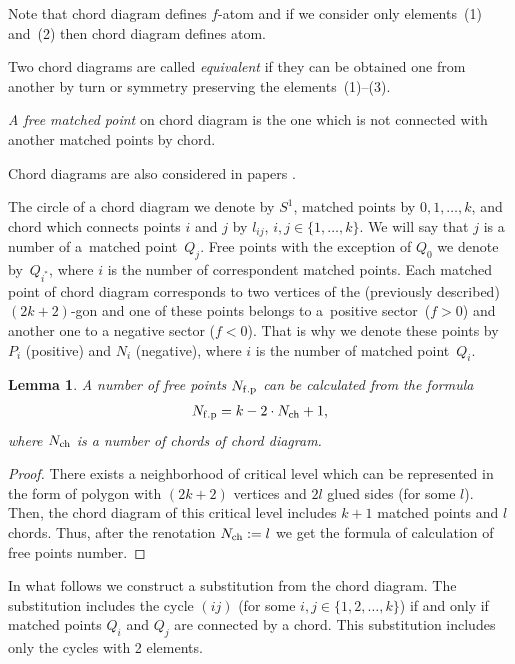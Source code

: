 \documentclass[10pt,a4paper]{amsart}
\numberwithin{equation}{section}
\newtheorem{Lemma}[Theorem]{Lemma}
 { \theoremstyle{definition}
\newtheorem{Definition}[Theorem]{Definition}
}
\begin{document}
Note that chord diagram def\/ines $f$-atom and if we consider only elements~(1) and~(2) then chord diagram def\/ines atom.

\begin{Definition}\label{definition3.5}
Two chord diagrams are called \emph{equivalent} if they can be obtained one from another by turn or symmetry preserving the elements~(1)--(3).
\end{Definition}

\begin{Definition}\label{definition3.6}
\emph{A free matched point} on chord diagram is the one which is not connected with another matched points by chord.
\end{Definition}

Chord diagrams are also considered in papers \cite{Kadubovskyi2015, Khruzin, Stoimenov2000}.

The circle of a chord diagram we denote by $S^{1}$, matched points by $0,1,\ldots,k$, and chord which connects points $i$ and $j$ by $l_{ij}$, $i,j\in\{1,\ldots,k\}$. We will say that $j$ is a number of a~matched point~$Q_{j}$. Free points with the exception of $Q_{0}$ we denote by~$Q_{i^{*}}$, where $i$ is the number of correspondent matched points. Each matched point of chord diagram corresponds to two vertices of the (previously described) $(2k+2)$-gon and one of these points belongs to a~positive sector~($f>0$) and another one to a negative sector ($f<0$). That is why we denote these points by~$P_{i}$ (positive) and $N_{i}$ (negative), where $i$ is the number of matched point~$Q_{i}$.

\begin{Lemma}\label{lemma3.1}
A number of free points $N_{\rm f.p}$ can be calculated from the formula
\begin{gather*}
N_{\rm f.p}=k-2\cdot N_{\rm ch}+1,
\end{gather*}
where $N_{\rm ch}$ is a number of chords of chord diagram.
\end{Lemma}

\begin{proof}
There exists a neighborhood of critical level which can be represented in the form of polygon with $(2k+2)$ vertices and $2l$ glued sides (for some $l$). Then, the chord diagram of this critical level includes $k+1$ matched points and $l$ chords. Thus, after the renotation $N_{\rm ch}:=l$ we get the formula of calculation of free points number.
\end{proof}

In what follows we construct a substitution from the chord diagram. The substitution includes the cycle $(ij)$ (for some $i,j\in\{1,2,\ldots,k\}$) if and only if matched points $Q_i$ and $Q_j$ are connected by a chord. This substitution includes only the cycles with 2 elements.
\end{document}
